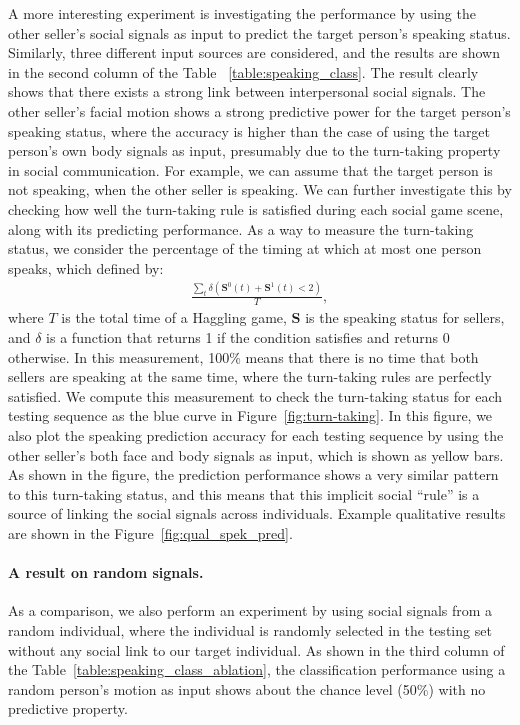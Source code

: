 A more interesting experiment is investigating the performance by using the other seller's social signals as input to predict the target person's speaking status. Similarly, three different input sources are considered, and the results are shown in the second column of the Table ~\ref{table:speaking_class}.  The result clearly shows that there exists a strong link between interpersonal social signals. The other seller's facial motion shows a strong predictive power for the target person's speaking status, where the accuracy is higher than the case of using the target person's own body signals as input, presumably due to the turn-taking property in social communication. For example, we can assume that the target person is not speaking, when the other seller is speaking. We can further investigate this by checking how well the turn-taking rule is satisfied during each social game scene, along with its predicting performance. As a way to measure the turn-taking status, we consider the percentage of the timing at which at most one person speaks, which defined by:
\begin{gather}	
\frac{\sum \limits_{t} \delta \left(\mathbf{S}^0(t) + \mathbf{S}^1(t) <2 \right)}{T},
\end{gather}
where $T$ is the total time of a Haggling game, $\mathbf{S}$ is the speaking status for sellers, and $\delta$ is a function that returns 1 if the condition satisfies and returns 0 otherwise. In this measurement, 100\% means that there is no time that both sellers are speaking at the same time, where the turn-taking rules are perfectly satisfied. We compute this measurement to check the turn-taking status for each testing sequence as the blue curve in Figure~\ref{fig:turn-taking}. In this figure, we also plot the speaking prediction accuracy for each testing sequence by using the other seller's both face and body signals as input, which is shown as yellow bars. As shown in the figure, the prediction performance shows a very similar pattern to this turn-taking status, and this means that this implicit social ``rule'' is a source of linking the social signals across individuals. Example qualitative results are shown in the Figure~\ref{fig:qual_spek_pred}.

\paragraph{A result on random signals.}
As a comparison, we also perform an experiment by using social signals from a random individual, where the individual is randomly selected in the testing set without any social link to our target individual. As shown in the third column of the Table~\ref{table:speaking_class_ablation}, the classification performance using a random person's motion as input shows about the chance level (50\%) with no predictive property.


